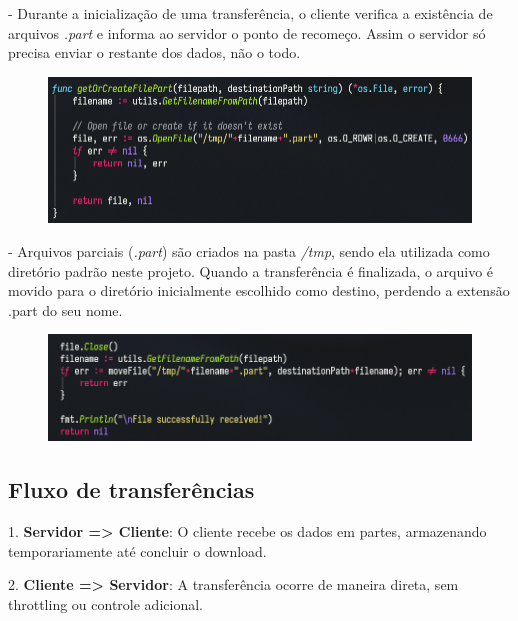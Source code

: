 \documentclass{article}
\begin{document}
- Durante a inicialização de uma transferência, o cliente verifica a existência de arquivos \textit{.part} e informa ao servidor o ponto de recomeço. Assim
o servidor só precisa enviar o restante dos dados, não o todo.

\begin{figure}[H]
	\centering
	\includegraphics[scale=0.5]{part.png}
\end{figure}

- Arquivos parciais (\textit{.part}) são criados na pasta \textit{/tmp}, sendo ela utilizada como diretório padrão neste projeto. Quando a transferência
é finalizada, o arquivo é movido para o diretório inicialmente escolhido como destino, perdendo a extensão .part do seu nome.

\begin{figure}[H]
	\centering
	\includegraphics[scale=0.5]{move.png}
\end{figure}

\subsection*{Fluxo de transferências}
1. \textbf{Servidor => Cliente}: O cliente recebe os dados em partes, armazenando temporariamente até concluir o download.

2. \textbf{Cliente => Servidor}: A transferência ocorre de maneira direta, sem throttling ou controle adicional.
\end{document}
